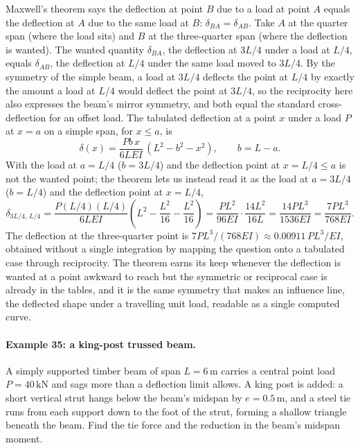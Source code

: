 Maxwell's theorem says the deflection at point $B$ due to a load at point
$A$ equals the deflection at $A$ due to the same load at $B$: $\delta_{BA}
= \delta_{AB}$. Take $A$ at the quarter span (where the load sits) and $B$
at the three-quarter span (where the deflection is wanted). The wanted
quantity $\delta_{BA}$, the deflection at $3L/4$ under a load at $L/4$,
equals $\delta_{AB}$, the deflection at $L/4$ under the same load moved to
$3L/4$. By the symmetry of the simple beam, a load at $3L/4$ deflects the
point at $L/4$ by exactly the amount a load at $L/4$ would deflect the
point at $3L/4$, so the reciprocity here also expresses the beam's mirror
symmetry, and both equal the standard cross-deflection for an offset load.
The tabulated deflection at a point $x$ under a load $P$ at $x = a$ on a
simple span, for $x \le a$, is
\[
\delta(x) = \frac{P b\,x}{6 L EI}\,(L^2 - b^2 - x^2),
\qquad b = L - a.
\]
With the load at $a = L/4$ ($b = 3L/4$) and the deflection point at $x =
L/4 \le a$ is not the wanted point; the theorem lets us instead read it as
the load at $a = 3L/4$ ($b = L/4$) and the deflection point at $x = L/4$,
\[
\delta_{3L/4,\,L/4} = \frac{P (L/4)(L/4)}{6 L EI}
\left(L^2 - \frac{L^2}{16} - \frac{L^2}{16}\right)
= \frac{P L^2}{96 EI}\cdot\frac{14 L^2}{16 L}
= \frac{14 P L^3}{1536 EI} = \frac{7 P L^3}{768 EI}.
\]
The deflection at the three-quarter point is $7 P L^3/(768 EI) \approx
0.00911\,P L^3/EI$, obtained without a single integration by mapping the
question onto a tabulated case through reciprocity. The theorem earns its
keep whenever the deflection is wanted at a point awkward to reach but the
symmetric or reciprocal case is already in the tables, and it is the same
symmetry that makes an influence line, the deflected shape under a
travelling unit load, readable as a single computed curve.

\paragraph{Example 35: a king-post trussed beam.} A simply supported
timber beam of span $L = 6\,\si{\meter}$ carries a central point load
$P = 40\,\text{kN}$ and sags more than a deflection limit allows. A king
post is added: a short vertical strut hangs below the beam's midspan by
$e = 0.5\,\si{\meter}$, and a steel tie runs from each support down to the
foot of the strut, forming a shallow triangle beneath the beam. Find the
tie force and the reduction in the beam's midspan moment.

